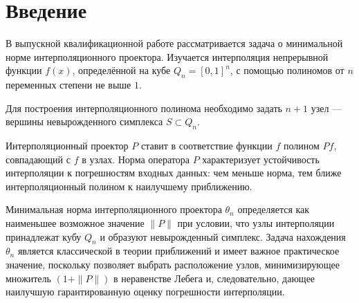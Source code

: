 \documentclass[main]{subfiles}
\begin{document}
\section*{Введение}

В выпускной квалификационной работе рассматривается задача о минимальной норме интерполяционного проектора. Изучается интерполяция непрерывной функции $f(x)$, определённой на кубе $Q_n = [0,1]^n$, с помощью полиномов от $n$ переменных степени не выше $1$.
\par
Для построения интерполяционного полинома необходимо задать $n+1$ узел — вершины невырожденного симплекса $S \subset Q_n$.
\par
Интерполяционный проектор $P$ ставит в соответствие функции $f$ полином $P f$, совпадающий с $f$ в узлах. Норма оператора $P$ характеризует устойчивость интерполяции к погрешностям входных данных: чем меньше норма, тем ближе интерполяционный полином к наилучшему приближению.

Минимальная норма интерполяционного проектора $\theta_n$ определяется как наименьшее возможное значение $\|P\|$ при условии, что узлы интерполяции принадлежат кубу $Q_n$ и образуют невырожденный симплекс. Задача нахождения $\theta_n$ является классической в теории приближений и имеет важное практическое значение, поскольку позволяет выбрать расположение узлов, минимизирующее множитель $(1 + \|P\|)$ в неравенстве Лебега и, следовательно, дающее наилучшую гарантированную оценку погрешности интерполяции.
\end{document}
